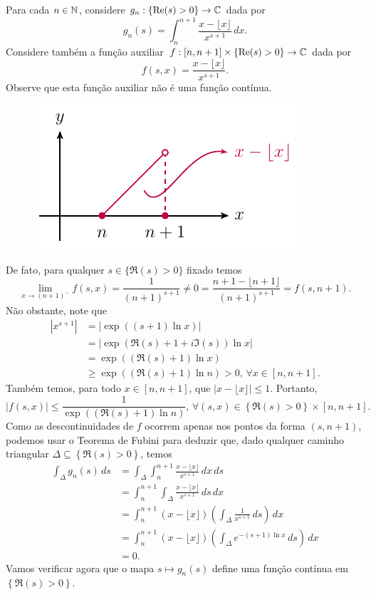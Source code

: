 \begin{exemplo}
Para cada $n\in\mathbb{N}$, considere $g_n:\{ \mathrm{Re}(s) > 0 \} \to \mathbb{C}$ dada por
%
\[
g_n(s) = \int_n^{n+1} \frac{x - \lfloor x \rfloor}{x^{s+1}} \, dx.
\]
%
Considere também a função auxiliar 
$f: [n, n+1]\times \{ \mathrm{Re}(s) > 0 \} \to \mathbb{C}$ 
dada por
%
\[
f(s,x) = \frac{x - \lfloor x \rfloor}{x^{s+1}}.
\]
%
Observe que esta função auxiliar não é uma função contínua.
%
\begin{figure}[H]\centering
    \includegraphics{Figuras/x - floor(x).pdf}
\end{figure}
%
De fato, para qualquer $s\in \{ \Re(s) > 0 \}$ fixado temos
%
\[
\lim_{x\to (n+1)^-} f(s,x)
= \frac{1}{(n+1)^{s+1}}
\neq 0 
= \frac{n+1 - \lfloor n+1 \rfloor}{(n+1)^{s+1}}
= f(s,n+1).
\]
%
Não obstante, note que
%
\begin{align*}
    |x^{s+1}| &= \left|\exp((s+1)\ln x)\right| \\
              &= \left|\exp\left( \Re(s) + 1 + i\Im(s) \right) \ln x\right| \\
              &= \exp\left( (\Re(s) + 1)\ln x \right) \\
              &\geq \exp\left( (\Re(s) + 1)\ln n \right) > 0, \, \forall x\in [n,n+1].
\end{align*}
%
Também temos, para todo $x\in[n,n+1]$, que $|x - \lfloor x \rfloor| \leq 1$. Portanto,
%
\[
|f(s,x)| \leq \frac{1}{\exp\left( (\Re(s) + 1)\ln n \right)}, \, 
\forall (s,x) \in \left\{ \Re(s) > 0 \right\}\times[n,n+1].
\]
%
Como as descontinuidades de $f$ ocorrem apenas nos pontos da forma $(s,n+1)$, podemos
usar o Teorema de Fubini para deduzir que, dado qualquer caminho triangular
$\Delta \subseteq \left\{ \Re(s) > 0 \right\}$, temos
%
\begin{align*}
    \int_{\Delta} g_n(s) \, ds 
    &= \int_{\Delta} \int_n^{n+1} \frac{x - \lfloor x \rfloor}{x^{s+1}} \, dx \, ds 
    \\[0.3cm]
    &= \int_n^{n+1} \int_{\Delta} \frac{x - \lfloor x \rfloor}{x^{s+1}} \, ds \, dx 
    \\[0.3cm]
    &= \int_n^{n+1} (x - \lfloor x \rfloor) 
    \left(\int_{\Delta} \frac{1}{x^{s+1}} \, ds \right) \, dx
    \\[0.3cm]
    &= \int_n^{n+1} (x - \lfloor x \rfloor) 
    \left(\int_{\Delta} e^{-(s+1)\ln x} \, ds \right) \, dx 
    \\[0.3cm]
    &= 0.
\end{align*}
%
Vamos verificar agora que o mapa $s\longmapsto g_n(s)$ define uma função contínua em 
$\left\{ \Re(s) > 0 \right\}$. 


\end{exemplo}
